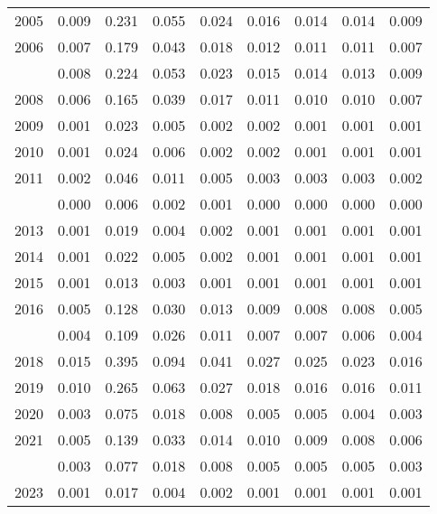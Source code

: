 \documentclass[
]{article}
\begin{document}
\begin{longtable}[t]{lrrrrrrrr}
2005 & 0.009 & 0.231 & 0.055 & 0.024 & 0.016 & 0.014 & 0.014 & 0.009\\
2006 & 0.007 & 0.179 & 0.043 & 0.018 & 0.012 & 0.011 & 0.011 & 0.007\\
\addlinespace
2007 & 0.008 & 0.224 & 0.053 & 0.023 & 0.015 & 0.014 & 0.013 & 0.009\\
2008 & 0.006 & 0.165 & 0.039 & 0.017 & 0.011 & 0.010 & 0.010 & 0.007\\
2009 & 0.001 & 0.023 & 0.005 & 0.002 & 0.002 & 0.001 & 0.001 & 0.001\\
2010 & 0.001 & 0.024 & 0.006 & 0.002 & 0.002 & 0.001 & 0.001 & 0.001\\
2011 & 0.002 & 0.046 & 0.011 & 0.005 & 0.003 & 0.003 & 0.003 & 0.002\\
\addlinespace
2012 & 0.000 & 0.006 & 0.002 & 0.001 & 0.000 & 0.000 & 0.000 & 0.000\\
2013 & 0.001 & 0.019 & 0.004 & 0.002 & 0.001 & 0.001 & 0.001 & 0.001\\
2014 & 0.001 & 0.022 & 0.005 & 0.002 & 0.001 & 0.001 & 0.001 & 0.001\\
2015 & 0.001 & 0.013 & 0.003 & 0.001 & 0.001 & 0.001 & 0.001 & 0.001\\
2016 & 0.005 & 0.128 & 0.030 & 0.013 & 0.009 & 0.008 & 0.008 & 0.005\\
\addlinespace
2017 & 0.004 & 0.109 & 0.026 & 0.011 & 0.007 & 0.007 & 0.006 & 0.004\\
2018 & 0.015 & 0.395 & 0.094 & 0.041 & 0.027 & 0.025 & 0.023 & 0.016\\
2019 & 0.010 & 0.265 & 0.063 & 0.027 & 0.018 & 0.016 & 0.016 & 0.011\\
2020 & 0.003 & 0.075 & 0.018 & 0.008 & 0.005 & 0.005 & 0.004 & 0.003\\
2021 & 0.005 & 0.139 & 0.033 & 0.014 & 0.010 & 0.009 & 0.008 & 0.006\\
\addlinespace
2022 & 0.003 & 0.077 & 0.018 & 0.008 & 0.005 & 0.005 & 0.005 & 0.003\\
2023 & 0.001 & 0.017 & 0.004 & 0.002 & 0.001 & 0.001 & 0.001 & 0.001\\*
\end{longtable}
\end{document}
